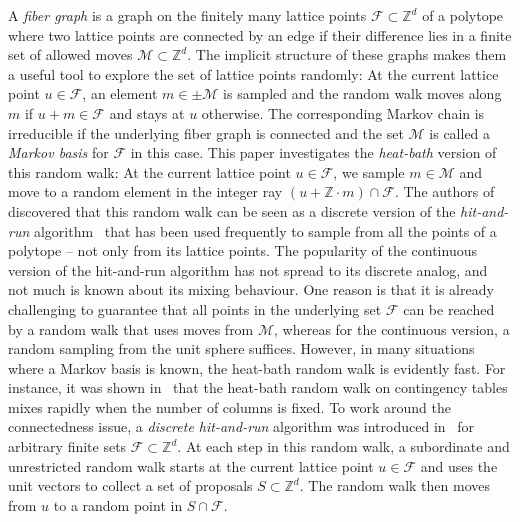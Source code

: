 \documentclass[11pt]{amsart}
\theoremstyle{definition}
\numberwithin{equation}{section}
\newcommand{\ring}[1]{\ensuremath{\mathbb{#1}}}
\renewcommand{\>}{\rangle}
\newcommand{\<}{\langle}
\newcommand{\0}{\mathbf{0}}
\newcommand{\1}{\mathbf{1}}
\newcommand{\2}{\mathbf{2}}
\newcommand\ZZ{\ring{Z}}
\newcommand\cF{{\mathcal F}}
\newcommand\cM{{\mathcal M}}
\begin{document}
A \emph{fiber graph} is a graph on the finitely many lattice points
$\cF\subset\ZZ^d$ of a polytope where two lattice points are connected
by an edge if their difference lies in a finite set of allowed moves
$\cM\subset\ZZ^d$. The implicit
structure of these graphs makes them a useful tool to explore the set of lattice
points randomly: At the current lattice point $u\in\cF$, an
element $m\in\pm\cM$ is sampled and the random walk moves along $m$ if
$u+m\in\cF$ and stays at $u$ otherwise. The corresponding Markov chain
is irreducible if the underlying fiber graph is connected and the set
$\cM$ is called a \emph{Markov basis} for $\cF$ in this case. 
This paper investigates the \emph{heat-bath} version of this random
walk: At the current lattice point $u\in\cF$, we sample $m\in\cM$ and
move to a random element in the integer ray $(u+\ZZ\cdot m)\cap\cF$.
The authors of~\cite{Diaconis1998a} discovered that this random
walk can be seen as a discrete version of the \emph{hit-and-run}
algorithm~\cite{lovasz1999,Vempala2005,Lovasz2006} that has been used frequently
to sample from all the points of a polytope -- not only from its
lattice points. The popularity of the continuous version of
the hit-and-run algorithm has not spread to its discrete analog, and
not much is known about its mixing behaviour. One reason is that it is
already challenging to guarantee that all points
in the underlying set $\cF$ can be reached by a random walk that uses
moves from $\cM$, whereas for the continuous version, a random sampling
from the unit sphere suffices. However, in many situations where a
Markov basis is known, the heat-bath random walk is evidently fast.
For instance, it was shown in~\cite{Cryan2002} that the heat-bath
random walk on contingency tables mixes rapidly when the number of
columns is fixed.
%
To work around the connectedness issue, a \emph{discrete
hit-and-run} algorithm was introduced in~\cite{Baumert2009} for
arbitrary finite sets $\cF\subset\ZZ^d$. 
%
At each step in this random walk, a subordinate and unrestricted
random walk starts at the current lattice point $u \in \cF$ and uses
the unit vectors to collect a set of proposals $S \subset \ZZ^d$. The
random walk then moves from $u$ to a random point in $S \cap \cF$.
\end{document}

